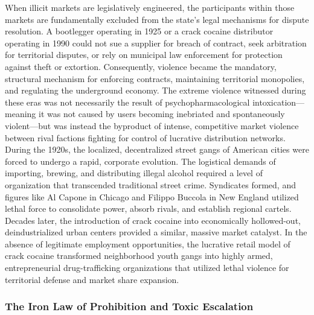 \documentclass[
]{article}
\begin{document}
When illicit markets are legislatively engineered, the participants
within those markets are fundamentally excluded from the state's legal
mechanisms for dispute resolution. A bootlegger operating in 1925 or a
crack cocaine distributor operating in 1990 could not sue a supplier for
breach of contract, seek arbitration for territorial disputes, or rely
on municipal law enforcement for protection against theft or extortion.
Consequently, violence became the mandatory, structural mechanism for
enforcing contracts, maintaining territorial monopolies, and regulating
the underground economy. The extreme violence witnessed during these
eras was not necessarily the result of psychopharmacological
intoxication---meaning it was not caused by users becoming inebriated
and spontaneously violent---but was instead the byproduct of intense,
competitive market violence between rival factions fighting for control
of lucrative distribution networks.\\
During the 1920s, the localized, decentralized street gangs of American
cities were forced to undergo a rapid, corporate evolution. The
logistical demands of importing, brewing, and distributing illegal
alcohol required a level of organization that transcended traditional
street crime. Syndicates formed, and figures like Al Capone in Chicago
and Filippo Buccola in New England utilized lethal force to consolidate
power, absorb rivals, and establish regional cartels. Decades later, the
introduction of crack cocaine into economically hollowed-out,
deindustrialized urban centers provided a similar, massive market
catalyst. In the absence of legitimate employment opportunities, the
lucrative retail model of crack cocaine transformed neighborhood youth
gangs into highly armed, entrepreneurial drug-trafficking organizations
that utilized lethal violence for territorial defense and market share
expansion.

\subsubsection{\texorpdfstring{\textbf{The Iron Law of Prohibition and
Toxic
Escalation}}{The Iron Law of Prohibition and Toxic Escalation}}\label{the-iron-law-of-prohibition-and-toxic-escalation}
\end{document}
